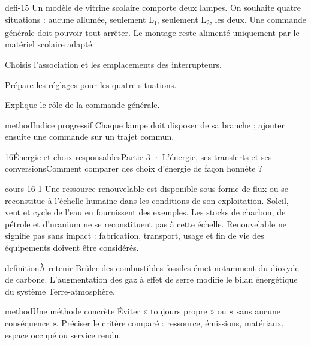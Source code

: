 \documentclass[12pt,twoside,openany]{book}
\begin{document}
\label{defi-ex-15}
\begin{pcFiche}{defi-15}
Un modèle de vitrine scolaire comporte deux lampes. On souhaite quatre situations : aucune allumée, seulement L₁, seulement L\textsubscript{2}, les deux. Une commande générale doit pouvoir tout arrêter. Le montage reste alimenté uniquement par le matériel scolaire adapté.\par
{}
\begin{questions}
\item Choisis l’association et les emplacements des interrupteurs.
\item Prépare les réglages pour les quatre situations.
\item Explique le rôle de la commande générale.
\end{questions}
\begin{pcEncadre}{method}{Indice progressif}
Chaque lampe doit disposer de sa branche ; ajouter ensuite une commande sur un trajet commun.\par
\end{pcEncadre}
\end{pcFiche}
\clearpage\pagestyle{otMain}
\begin{ouverture}[college3]{16}{Énergie et choix responsables}{Partie 3 · L’énergie, ses transferts et ses conversions}{Comment comparer des choix d’énergie de façon honnête ?}
\end{ouverture}
\label{ch-16-cours-1}
\label{ess-16}
\begin{pcFiche}{cours-16-1}
Une ressource renouvelable est disponible sous forme de flux ou se reconstitue à l’échelle humaine dans les conditions de son exploitation. Soleil, vent et cycle de l’eau en fournissent des exemples. Les stocks de charbon, de pétrole et d’uranium ne se reconstituent pas à cette échelle. Renouvelable ne signifie pas sans impact : fabrication, transport, usage et fin de vie des équipements doivent être considérés.\par
{}
\begin{pcEncadre}{definition}{À retenir}
Brûler des combustibles fossiles émet notamment du dioxyde de carbone. L’augmentation des gaz à effet de serre modifie le bilan énergétique du système Terre-atmosphère.\par
\end{pcEncadre}
\begin{pcEncadre}{method}{Une méthode concrète}
Éviter « toujours propre » ou « sans aucune conséquence ». Préciser le critère comparé : ressource, émissions, matériaux, espace occupé ou service rendu.\par
\end{pcEncadre}
\end{pcFiche}
\end{document}
